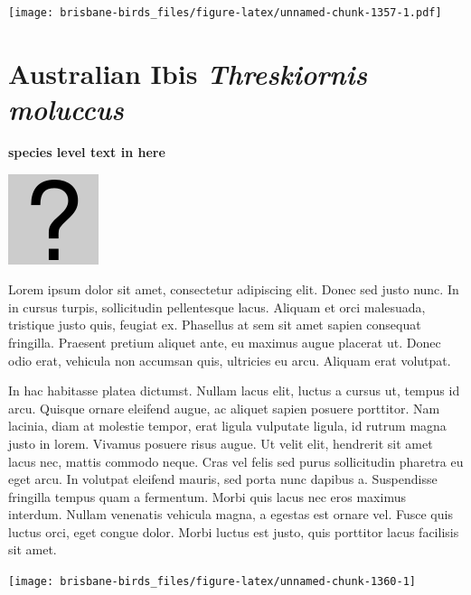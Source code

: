 \documentclass[]{book}
\let\origfigure\figure
\let\endorigfigure\endfigure
\renewenvironment{figure}[1][2] {
  \expandafter\origfigure\expandafter[H]
} {
  \endorigfigure
}
\begin{document}
\begin{figure}
\centering
\texttt{[image: brisbane-birds\_files/figure-latex/unnamed-chunk-1357-1.pdf]}
\caption{\label{fig:unnamed-chunk-1357}insert figure caption}
\end{figure}

\section{\texorpdfstring{Australian Ibis \emph{Threskiornis
moluccus}}{Australian Ibis Threskiornis moluccus}}\label{australian-ibis-threskiornis-moluccus}

\textbf{species level text in here}

\begin{figure}
\centering
\includegraphics{assets/missing.png}
\caption{No image for species}
\end{figure}

Lorem ipsum dolor sit amet, consectetur adipiscing elit. Donec sed justo
nunc. In in cursus turpis, sollicitudin pellentesque lacus. Aliquam et
orci malesuada, tristique justo quis, feugiat ex. Phasellus at sem sit
amet sapien consequat fringilla. Praesent pretium aliquet ante, eu
maximus augue placerat ut. Donec odio erat, vehicula non accumsan quis,
ultricies eu arcu. Aliquam erat volutpat.

In hac habitasse platea dictumst. Nullam lacus elit, luctus a cursus ut,
tempus id arcu. Quisque ornare eleifend augue, ac aliquet sapien posuere
porttitor. Nam lacinia, diam at molestie tempor, erat ligula vulputate
ligula, id rutrum magna justo in lorem. Vivamus posuere risus augue. Ut
velit elit, hendrerit sit amet lacus nec, mattis commodo neque. Cras vel
felis sed purus sollicitudin pharetra eu eget arcu. In volutpat eleifend
mauris, sed porta nunc dapibus a. Suspendisse fringilla tempus quam a
fermentum. Morbi quis lacus nec eros maximus interdum. Nullam venenatis
vehicula magna, a egestas est ornare vel. Fusce quis luctus orci, eget
congue dolor. Morbi luctus est justo, quis porttitor lacus facilisis sit
amet.

\begin{figure}
\texttt{[image: brisbane-birds\_files/figure-latex/unnamed-chunk-1360-1]} \caption{insert figure caption}\label{fig:unnamed-chunk-1360}
\end{figure}
\end{document}
